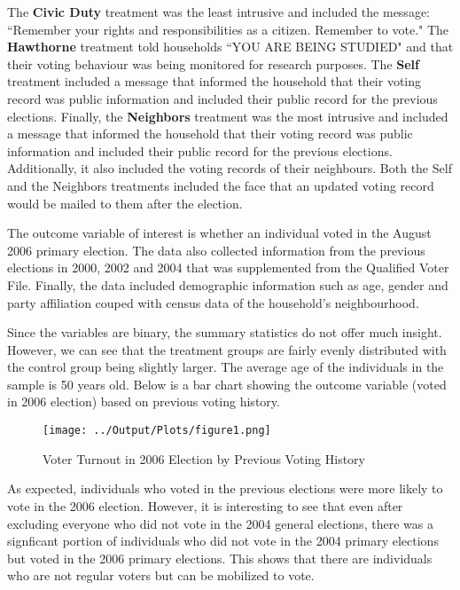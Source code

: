 \documentclass[11pt]{article}
\begin{document}
The \textbf{Civic Duty} treatment was the least intrusive and included the message: ``Remember your rights and responsibilities as a citizen. Remember to vote." The \textbf{Hawthorne} treatment told households ``YOU ARE BEING STUDIED" and that their voting behaviour was being monitored for research purposes. The \textbf{Self} treatment included a message that informed the household that their voting record was public information and included their public record for the previous elections. Finally, the \textbf{Neighbors} treatment was the most intrusive and included a message that informed the household that their voting record was public information and included their public record for the previous elections. Additionally, it also included the voting records of their neighbours.
Both the Self and the Neighbors treatments included the face that an updated voting record would be mailed to them after the election.

The outcome variable of interest is whether an individual voted in the August 2006 primary election. The data also collected information from the previous elections in 2000, 2002 and 2004 that was supplemented from the Qualified Voter File. Finally, the data included demographic information such as age, gender and party affiliation couped with census data of the household's neighbourhood.


Since the variables are binary, the summary statistics do not offer much insight. However, we can see that the treatment groups are fairly evenly distributed with the control group being slightly larger. The average age of the individuals in the sample is 50 years old. Below is a bar chart showing the outcome variable (voted in 2006 election) based on previous voting history.
\begin{figure}[H]
    \centering
    \texttt{[image: ../Output/Plots/figure1.png]}   
    \caption{Voter Turnout in 2006 Election by Previous Voting History}
    \label{fig:figure1}
\end{figure}

As expected, individuals who voted in the previous elections were more likely to vote in the 2006 election. However, it is interesting to see that even after excluding everyone who did not vote in the 2004 general elections, there was a signficant portion of individuals who did not vote in the 2004 primary elections but voted in the 2006 primary elections. This shows that there are individuals who are not regular voters but can be mobilized to vote. 
\end{document}

